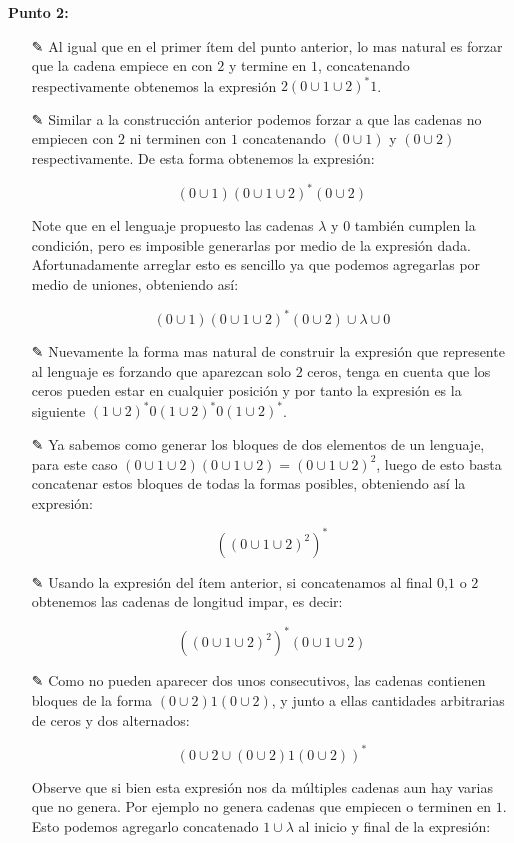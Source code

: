 \textbf{Punto 2:} \begin{itemize}
    \item[✎] Al igual que en el primer ítem del punto anterior, lo mas natural es forzar que la cadena empiece en con $2$ y termine en $1$, concatenando respectivamente obtenemos la expresión $2(0\cup1\cup2)^*1$.

    \item[✎] Similar a la construcción anterior podemos forzar a que las cadenas no empiecen con $2$ ni terminen con $1$ concatenando $(0\cup1)$ y $(0\cup2)$ respectivamente. De esta forma obtenemos la expresión:
    
    $$(0\cup1)(0\cup1\cup2)^*(0\cup2)$$

    Note que en el lenguaje propuesto las cadenas $\lambda$ y $0$ también cumplen la condición, pero es imposible generarlas por medio de la expresión dada. Afortunadamente arreglar esto es sencillo ya que podemos agregarlas por medio de uniones, obteniendo así:

    $$(0\cup1)(0\cup1\cup2)^*(0\cup2)\cup\lambda\cup0$$

    \item[✎] Nuevamente la forma mas natural de construir la expresión que represente al lenguaje es forzando que aparezcan solo $2$ ceros, tenga en cuenta que los ceros pueden estar en cualquier posición y por tanto la expresión es la siguiente $(1\cup2)^*0(1\cup2)^*0(1\cup2)^*$.

    \item[✎] Ya sabemos como generar los bloques de dos elementos de un lenguaje, para este caso $(0\cup1\cup2)(0\cup1\cup2)=(0\cup1\cup2)^2$, luego de esto basta concatenar estos bloques de todas la formas posibles, obteniendo así la expresión:

    $$\left((0\cup1\cup2)^2\right)^*$$

    \item[✎] Usando la expresión del ítem anterior, si concatenamos al final $0$,$1$ o $2$ obtenemos las cadenas de longitud impar, es decir:
    
    $$\left((0\cup1\cup2)^2\right)^*(0\cup1\cup2)$$

    \item[✎] Como no pueden aparecer dos unos consecutivos, las cadenas contienen bloques de la forma $(0\cup2)1(0\cup2)$, y junto a ellas cantidades arbitrarias de ceros y dos alternados:

    $$(0\cup2\cup(0\cup2)1(0\cup2))^*$$

    Observe que si bien esta expresión nos da múltiples cadenas aun hay varias que no genera. Por ejemplo no genera cadenas que empiecen o terminen en $1$. Esto podemos agregarlo concatenado $1\cup\lambda$ al inicio y final de la expresión:


\end{itemize}

